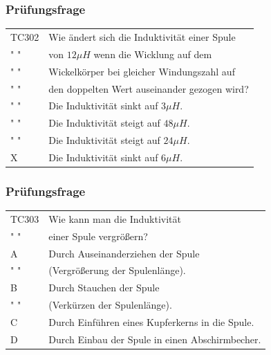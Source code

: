 \begin{frame}
    \frametitle{Prüfungsfrage}

    \begin{center}
    \begin{tabular}{l||l}\hline
        TC302 & Wie ändert sich die Induktivität einer Spule \\
         " "  & von $12 \mu H$ wenn die Wicklung auf dem \\ 
         " "  & Wickelkörper bei gleicher Windungszahl auf\\
           " "  & den doppelten Wert auseinander gezogen wird? \\\hline\hline
        " " & Die Induktivität sinkt auf $3 \mu H$. \\ \hline
        " " & Die Induktivität steigt auf $48 \mu H$. \\ \hline
        " " & Die Induktivität steigt auf $24 \mu H$. \\ \hline
        X & Die Induktivität sinkt auf $6 \mu H$. \\ \hline
    \end{tabular}
 	    \end{center}
\end{frame}

\begin{frame}
    \frametitle{Prüfungsfrage}

    \begin{center}
    \begin{tabular}{l||l}\hline
        TC303 & Wie kann man die Induktivität\\
         " "  & einer Spule vergrößern?\\\hline\hline
        A & Durch Auseinanderziehen der Spule \\
        " " & (Vergrößerung der Spulenlänge). \\ \hline
    	B & Durch Stauchen der Spule \\
        " " & (Verkürzen der Spulenlänge). \\ \hline
        C &  Durch Einführen eines Kupferkerns in die Spule. \\ \hline
        D & Durch Einbau der Spule in einen Abschirmbecher. \\ \hline
    \end{tabular}
 	    \end{center}
\end{frame}

